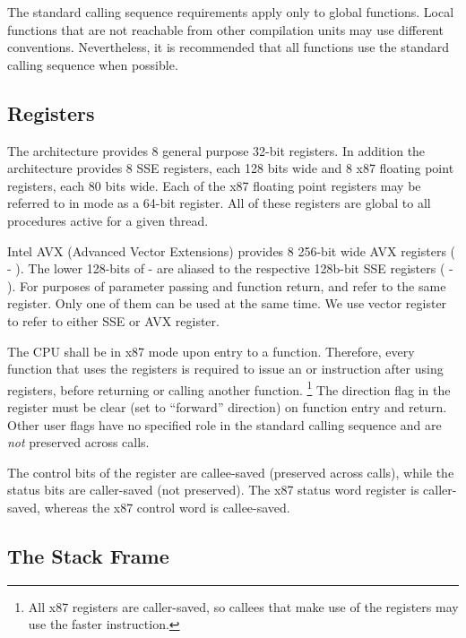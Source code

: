 The standard calling sequence requirements apply only to global
functions.  Local functions that are not reachable from other
compilation units may use different conventions.  Nevertheless, it is
recommended that all functions use the standard calling sequence when
possible.

\subsection{Registers}
\label{subsec-registers}

The \xARCH architecture provides 8 general purpose 32-bit registers.
In addition the architecture provides 8 SSE registers, each 128 bits
wide and 8 x87 floating point registers, each 80 bits wide.  Each of
the x87 floating point registers may be referred to in \MMX
mode as a 64-bit register.  All of these registers are global to all
procedures active for a given thread.

Intel AVX (Advanced Vector Extensions) provides 8 256-bit wide AVX registers
( - ).  The lower 128-bits of  - 
are aliased to the respective 128b-bit SSE registers ( -
). For purposes of parameter passing and function return,
 and  refer to the same register. Only one of them
can be used at the same time.  We use vector register to refer to either
SSE or AVX register.

The CPU shall be in x87 mode upon entry to a function.  Therefore,
every function that uses the \MMX registers is required to issue an
 or  instruction after using \MMX registers, before
returning or calling another function.  \footnote{All x87 registers
are caller-saved, so callees that make use of the \MMX registers may
use the faster  instruction.}  The direction flag  in the
 register must be clear (set to ``forward'' direction) on function
entry and return.  Other user flags have no specified role in the
standard calling sequence and are {\em not} preserved across calls.

The control bits of the  register are callee-saved
(preserved across calls), while the status bits are caller-saved (not
preserved).  The x87 status word register is caller-saved, whereas
the x87 control word is callee-saved.

\subsection{The Stack Frame}
\label{sec-stack-frame}

